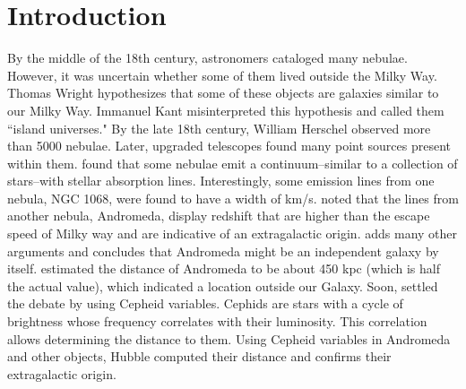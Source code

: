 \section{Introduction}




By the middle of the 18th century, astronomers cataloged many nebulae. %
However, it was uncertain whether some of them lived outside the Milky Way.  Thomas Wright hypothesizes that some of these objects are galaxies similar to our Milky Way. Immanuel Kant misinterpreted this hypothesis and called them ``island universes." By the late 18th century, William Herschel observed more than 5000 nebulae.  Later, upgraded telescopes found many point sources present within them. \citet{fath1909spectra} found that some nebulae emit a continuum--similar to a  collection of stars--with stellar absorption lines.  Interestingly, some emission lines from one nebula, NGC 1068, were found to have a width of   km/s. 
\citet{slipher1913radial} noted that the lines from another nebula, Andromeda, display redshift that are higher than the escape speed of Milky way and are indicative of an extragalactic origin. \citet{curtis1919modern} adds many other arguments and concludes that  Andromeda might be an independent galaxy by itself. \citet{opik1922estimate}  estimated the distance of Andromeda to be about 450 kpc (which is half the actual value), which indicated a location outside our Galaxy. Soon, \citet{hubble1929relation} settled the debate by using Cepheid variables. Cephids are stars with a cycle of brightness whose frequency correlates with their luminosity. This correlation allows determining the distance to them. Using Cepheid variables in Andromeda and other objects, Hubble computed their distance and confirms their extragalactic origin.

